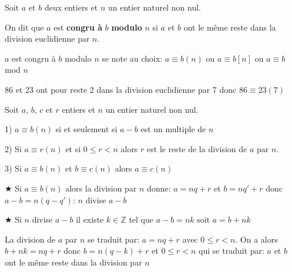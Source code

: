 \documentclass[french]{book}
\begin{document}
\begin{defn}
Soit $a$ et $b$ deux entiers et $n$ un entier naturel non nul.

On dit que $a$ est \textbf{congru à} $b$ \textbf{modulo} $n$ si $a$ et $b$ ont le même reste dans la division euclidienne par $n$.

\end{defn}

\begin{rem}

$a$ est congru à $b$ modulo $n$ se note au choix:
$a \equiv b \left( n\right) $ ou $a \equiv b \left[ n\right] $ ou $a \equiv b$ mod $ n$
 
 \end{rem}
 
\begin{exemple}
86 et 23 ont pour reste 2 dans la division euclidienne par 7 donc $86\equiv 23 \left( 7\right) $

\end{exemple}

\begin{thm}
Soit $a$, $b$, $c$ et $r$ entiers et $n$ un entier naturel non nul.

1) $a \equiv b \left( n\right) $ si et seulement si $a-b$ est un multiple de $n$

2) Si $a \equiv r \left( n\right) $ et si $0 \leq r < n$ alors $r$ est le reste de la division de $a$ par $n$.

3) Si $a \equiv b \left( n\right) $ et  $b \equiv c \left( n\right) $ alors $a \equiv c \left( n\right) $

\end{thm}



\begin{demo}

  $\bigstar$ Si $a \equiv b \left( n\right) $ alors la division  par $n$ donne: $a=nq+r$ et $b=nq'+r$ donc $a-b=n(q-q')$: $n$ divise $a-b$
  
 $\bigstar$ Si $n$ divise $a-b$ il existe $k \in\mathbb{Z}$ tel que $a-b=nk$ soit $a=b+nk$
  
  La division de $a$ par $n$ se traduit par: $a=nq+r$ avec $0\leq r <n$. On a alors $b+nk=nq+r$ donc $b=n(q-k)+r$ et $0\leq r < n$ qui se traduit par: $a$ et $b$ ont le même reste dans la division par $n$

\end{demo}
\end{document}
